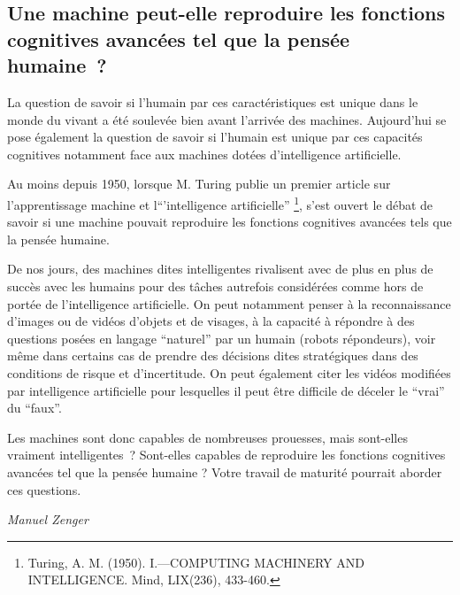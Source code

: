 \documentclass[
  10pt,
  french,
  a5paper,
  openany]{book}
\newenvironment{signature}{\begin{flushright}}{\end{flushright}}
\begin{document}
\hypertarget{une-machine-peut-elle-reproduire-les-fonctions-cognitives-avancuxe9es-tel-que-la-pensuxe9e-humaine}{%
\subsection*{Une machine peut-elle reproduire les fonctions cognitives avancées tel que la pensée humaine~?}\label{une-machine-peut-elle-reproduire-les-fonctions-cognitives-avancuxe9es-tel-que-la-pensuxe9e-humaine}}

La question de savoir si l'humain par ces caractéristiques est unique dans le monde du vivant a été soulevée bien avant l'arrivée des machines. Aujourd'hui se pose également la question de savoir si l'humain est unique par ces capacités cognitives notamment face aux machines dotées d'intelligence artificielle.

Au moins depuis 1950, lorsque M. Turing publie un premier article sur l'apprentissage machine et l``'intelligence artificielle'' \footnote{Turing, A. M. (1950). I.---COMPUTING MACHINERY AND INTELLIGENCE. Mind, LIX(236), 433-460.}, s'est ouvert le débat de savoir si une machine pouvait reproduire les fonctions cognitives avancées tels que la pensée humaine.

De nos jours, des machines dites intelligentes rivalisent avec de plus en plus de succès avec les humains pour des tâches autrefois considérées comme hors de portée de l'intelligence artificielle. On peut notamment penser à la reconnaissance d'images ou de vidéos d'objets et de visages, à la capacité à répondre à des questions posées en langage ``naturel'' par un humain (robots répondeurs), voir même dans certains cas de prendre des décisions dites stratégiques dans des conditions de risque et d'incertitude. On peut également citer les vidéos modifiées par intelligence artificielle pour lesquelles il peut être difficile de déceler le ``vrai'' du ``faux''.

Les machines sont donc capables de nombreuses prouesses, mais sont-elles vraiment intelligentes~? Sont-elles capables de reproduire les fonctions cognitives avancées tel que la pensée humaine ? Votre travail de maturité pourrait aborder ces questions.

\begin{signature}
\emph{Manuel Zenger}

\end{signature}
\end{document}
